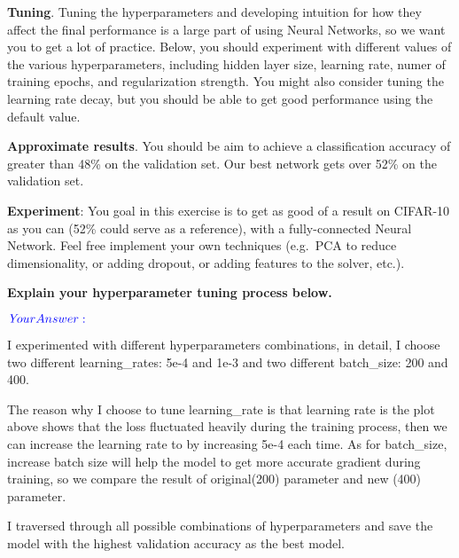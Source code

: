 \documentclass[11pt]{article}
\begin{document}
\textbf{Tuning}. Tuning the hyperparameters and developing intuition for
how they affect the final performance is a large part of using Neural
Networks, so we want you to get a lot of practice. Below, you should
experiment with different values of the various hyperparameters,
including hidden layer size, learning rate, numer of training epochs,
and regularization strength. You might also consider tuning the learning
rate decay, but you should be able to get good performance using the
default value.

\textbf{Approximate results}. You should be aim to achieve a
classification accuracy of greater than 48\% on the validation set. Our
best network gets over 52\% on the validation set.

\textbf{Experiment}: You goal in this exercise is to get as good of a
result on CIFAR-10 as you can (52\% could serve as a reference), with a
fully-connected Neural Network. Feel free implement your own techniques
(e.g.~PCA to reduce dimensionality, or adding dropout, or adding
features to the solver, etc.).

    \textbf{Explain your hyperparameter tuning process below.}

\(\color{blue}{\textit Your Answer:}\)

I experimented with different hyperparameters combinations, in detail, I
choose two different learning\_rates: 5e-4 and 1e-3 and two different
batch\_size: 200 and 400.

The reason why I choose to tune learning\_rate is that learning rate is
the plot above shows that the loss fluctuated heavily during the
training process, then we can increase the learning rate to by
increasing 5e-4 each time. As for batch\_size, increase batch size will
help the model to get more accurate gradient during training, so we
compare the result of original(200) parameter and new (400) parameter.

I traversed through all possible combinations of hyperparameters and
save the model with the highest validation accuracy as the best model.
\end{document}
